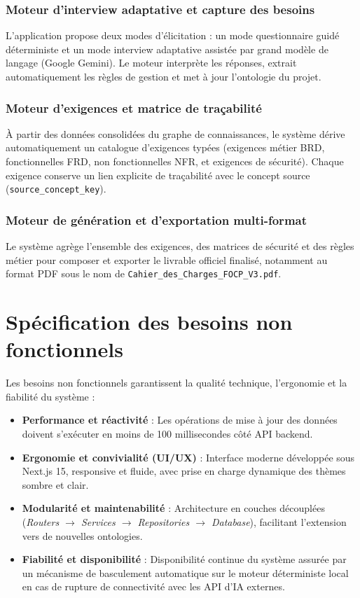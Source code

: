 \subsubsection{Moteur d'interview adaptative et capture des besoins}
L'application propose deux modes d'élicitation : un mode questionnaire guidé déterministe et un mode interview adaptative assistée par grand modèle de langage (Google Gemini). Le moteur interprète les réponses, extrait automatiquement les règles de gestion et met à jour l'ontologie du projet.

\subsubsection{Moteur d'exigences et matrice de traçabilité}
À partir des données consolidées du graphe de connaissances, le système dérive automatiquement un catalogue d'exigences typées (exigences métier BRD, fonctionnelles FRD, non fonctionnelles NFR, et exigences de sécurité). Chaque exigence conserve un lien explicite de traçabilité avec le concept source (\texttt{source\_concept\_key}).

\subsubsection{Moteur de génération et d'exportation multi-format}
Le système agrège l'ensemble des exigences, des matrices de sécurité et des règles métier pour composer et exporter le livrable officiel finalisé, notamment au format PDF sous le nom de \texttt{Cahier\_des\_Charges\_FOCP\_V3.pdf}.

\section{Spécification des besoins non fonctionnels}

Les besoins non fonctionnels garantissent la qualité technique, l'ergonomie et la fiabilité du système :
\begin{itemize}
    \item \textbf{Performance et réactivité} : Les opérations de mise à jour des données doivent s'exécuter en moins de 100 millisecondes côté API backend.
    \item \textbf{Ergonomie et convivialité (UI/UX)} : Interface moderne développée sous Next.js 15, responsive et fluide, avec prise en charge dynamique des thèmes sombre et clair.
    \item \textbf{Modularité et maintenabilité} : Architecture en couches découplées (\textit{Routers $\rightarrow$ Services $\rightarrow$ Repositories $\rightarrow$ Database}), facilitant l'extension vers de nouvelles ontologies.
    \item \textbf{Fiabilité et disponibilité} : Disponibilité continue du système assurée par un mécanisme de basculement automatique sur le moteur déterministe local en cas de rupture de connectivité avec les API d'IA externes.
\end{itemize}

